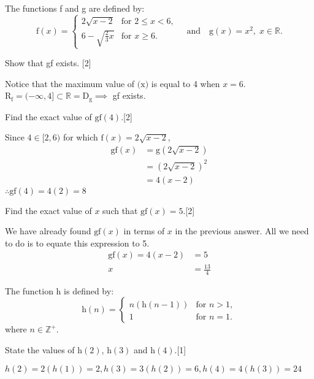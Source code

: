 \documentclass[12pt, a4 paper]{article}
\begin{document}
\begin{outline}[enumerate]
 \1 The functions f and g are defined by: \[\textrm{f}(x)=
  \begin{cases}
   2\sqrt{x-2}           & \textrm{for }2\leq x<6, \\
   6-\sqrt{\frac{2}{3}x} & \textrm{for }x\geq6.
  \end{cases}
  \quad\textrm{and}\quad \textrm{g}(x)=x^2,\;x\in \mathbb{R}.\]

 \2 Show that gf exists. \hfill[2]
 \begin{answer}
  Notice that the maximum value of \(\textrm{(x)}\) is equal to 4 when \(x=6\).\\
  R\(_\textrm{f} = (-\infty,4] \subset \mathbb{R} = \textrm{D}_{\textrm{g}}\implies \) gf exists.
 \end{answer}
 \2 Find the exact value of \(\textrm{gf}(4)\).\hfill[2]
 \begin{answer}
  Since \(4\in [2,6)\) for which \(\textrm{f}(x)=2\sqrt{x-2}\),
  \begin{align*}
   \textrm{gf}(x) & = \textrm{g}(2\sqrt{x-2}) \\
                  & = {(2\sqrt{x-2})}^2         \\
                  & = 4(x-2)
  \end{align*}
  \(\therefore \textrm{gf}(4)=4(2)=8\)
 \end{answer}
 \2 Find the exact value of \(x\) such that \(\textrm{gf}(x)=5\).\hfill[2]
 \begin{answer}
  We have already found \(\textrm{gf}(x)\) in terms of \(x\) in the previous answer. All we need to do is to equate this expression to 5.
  \begin{align*}
   \textrm{gf}(x) = 4(x-2) & = 5           \\
   x                       & =\frac{13}{4}
  \end{align*}
 \end{answer}
 \1 The function h is defined by: \[\textrm{h}(n)=
  \begin{cases}
   n(\textrm{h}(n-1)) & \textrm{for }n>1, \\
   1                  & \textrm{for }n=1.
  \end{cases}\]
 where \(n \in \mathbb{Z}^+\).

 \2 State the values of \(\textrm{h}(2)\), \(\textrm{h}(3)\) and \(\textrm{h}(4)\).\hfill[1]
 \begin{answer}
  \(h(2)=2(h(1))=2, h(3)=3(h(2))=6, h(4)=4(h(3))=24\)
 \end{answer}


\end{outline}
\end{document}
